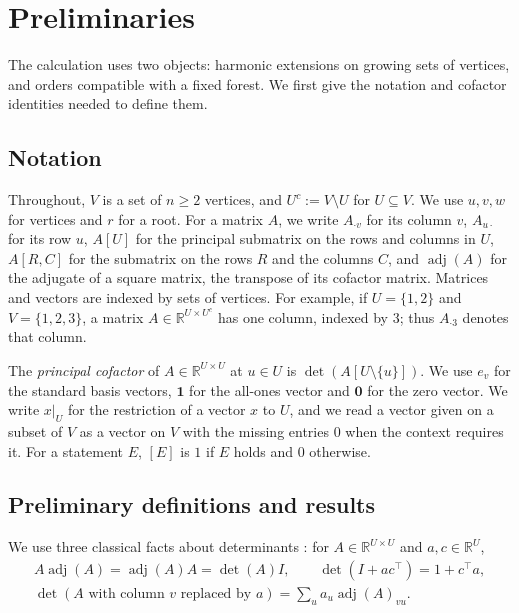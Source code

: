 \documentclass[onefignum,onetabnum,nohypdvips]{siamart250211}
\numberwithin{theorem}{section}
\numberwithin{equation}{section}
\newcommand{\R}{\mathbb{R}}
\newcommand{\one}{\mathbf{1}}
\newcommand{\zero}{\mathbf{0}}
\DeclareMathOperator{\adj}{adj}
\begin{document}
\section{Preliminaries}\label{sec:prelim}

The calculation uses two objects: harmonic extensions on growing
sets of vertices, and orders compatible with a fixed forest. We first
give the notation and cofactor identities needed to define them.


\subsection{Notation}\label{sec:notation}
Throughout, $V$ is a set of $n\ge2$ vertices, and
$U^c:=V\setminus U$ for $U\subseteq V$. We use $u,v,w$ for vertices
and $r$ for a root.
For a matrix $A$, we write $A_{\cdot v}$ for its column $v$, $A_{u\cdot}$ for its row $u$,
$A[U]$ for the principal submatrix on the rows and columns in $U$,
$A[R,C]$ for the submatrix on the rows $R$ and the columns $C$, and
$\adj(A)$ for the adjugate of a square matrix, the transpose of its
cofactor matrix. Matrices and vectors are indexed by sets of vertices.
For example, if $U=\{1,2\}$ and $V=\{1,2,3\}$, a matrix
$A\in\R^{U\times U^c}$ has one column, indexed by $3$; thus
$A_{\cdot3}$ denotes that column.


The \emph{principal cofactor} of $A\in\R^{U\times U}$
at $u\in U$ is $\det(A[U\setminus\{u\}])$. We use $e_v$ for the
standard basis vectors, $\one$ for the all-ones vector and $\zero$ for
the zero vector. We write $x|_U$ for the restriction of a vector $x$
to $U$, and we read a vector given on a subset of $V$ as a vector on
$V$ with the missing entries $0$ when the context requires it. For a statement $E$,
$[E]$ is $1$ if $E$ holds and $0$ otherwise.

\subsection{Preliminary definitions and results}\label{sec:preliminary-def}


We use three classical facts about determinants
\cite[\S\S0.8.2--0.8.5]{HornJohnson2013}: for $A\in\R^{U\times U}$ and
$a,c\in\R^U$,
\begin{equation}\label{eq:adj}
\begin{gathered}
A\adj(A)=\adj(A)A=\det(A)I,\qquad \det(I+ac^{\top})=1+c^{\top}a,\\
\det(A\text{ with column $v$ replaced by }a)=\textstyle\sum_u a_u\adj(A)_{vu}.
\end{gathered}
\end{equation}
\end{document}
